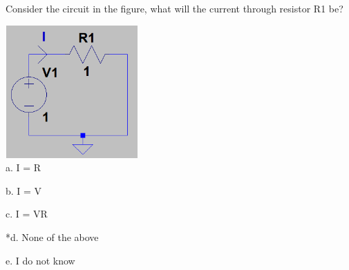 
Consider the circuit in the figure, what will the current through resistor R1 be?

\includegraphics[width=2in,height=2in]{../../Images/OhmsLawQ10.png} \\

a. I = R

b. I = V

c. I = VR

*d. None of the above

e. I do not know \\
